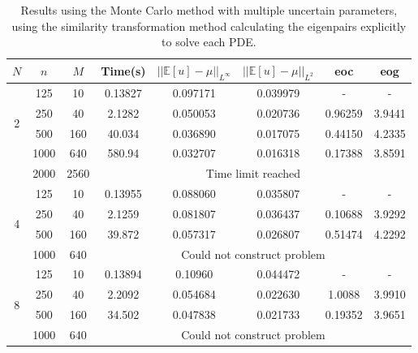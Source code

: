\documentclass[11pt]{article}
\numberwithin{equation}{section}
\begin{document}
\begin{table}[H]
\centering
\begin{tabular}{|c|c|c|c|c|c|c|c|}
\hline
$N$ & $n$ & $M$ & Time(s) & $|| \mathbb{E}[u] - \mu ||_{L^{\infty}}$ & $|| \mathbb{E}[u] - \mu ||_{L^{2}}$ & eoc & eog \\
\hline
\multirow{4}{*}{2} & 125 & 10 & 0.13827 & 0.097171 & 0.039979 & - & - \\
& 250 & 40 & 2.1282 & 0.050053 & 0.020736 & 0.96259 & 3.9441 \\
& 500 & 160 & 40.034 & 0.036890 & 0.017075 & 0.44150 & 4.2335 \\
& 1000 & 640 & 580.94 & 0.032707 & 0.016318 & 0.17388 & 3.8591 \\
\cline{4-8}
& 2000 & 2560 & \multicolumn{5}{c|}{Time limit reached} \\
\hline
\multirow{4}{*}{4} & 125 & 10 & 0.13955 & 0.088060 & 0.035807 & - & - \\
& 250 & 40 & 2.1259 & 0.081807 & 0.036437 & 0.10688 & 3.9292 \\
& 500 & 160 & 39.872 & 0.057317 & 0.026807 & 0.51474 & 4.2292 \\
\cline{4-8}
& 1000 & 640 & \multicolumn{5}{c|}{Could not construct problem} \\
\hline
\multirow{4}{*}{8} & 125 & 10 & 0.13894 & 0.10960 & 0.044472 & - & - \\
& 250 & 40 & 2.2092 & 0.054684 & 0.022630 & 1.0088 & 3.9910 \\
& 500 & 160 & 34.502 & 0.047838 & 0.021733 & 0.19352 & 3.9651 \\
\cline{4-8}
& 1000 & 640 & \multicolumn{5}{c|}{Could not construct problem} \\
\hline
\end{tabular}
\captionsetup{justification=centering}
\caption{Results using the Monte Carlo method with multiple uncertain parameters, using the similarity transformation method calculating the eigenpairs explicitly to solve each PDE.}
\label{table:monte carlo multiple}
\end{table}
\end{document}
